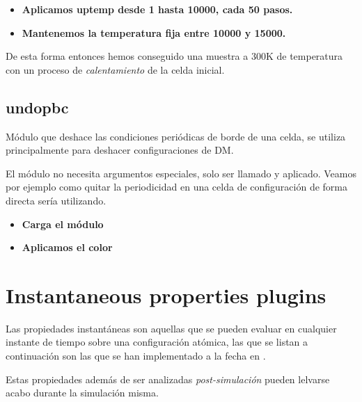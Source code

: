 \begin{itemize}
 \item \textbf{Aplicamos \textbf{uptemp} desde 1 hasta 10000, cada 50 pasos.}
 \item \textbf{Mantenemos la temperatura fija entre 10000 y 15000.}
\end{itemize}

De esta forma entonces hemos conseguido una muestra a 300K de temperatura con un
proceso de \textit{calentamiento} de la celda inicial.

\subsection{undopbc}
M\'odulo que deshace las condiciones peri\'odicas de borde de una celda, se
utiliza principalmente para deshacer configuraciones de DM.

El m\'odulo no necesita argumentos especiales, solo ser llamado y aplicado.
Veamos por ejemplo como quitar la periodicidad en una celda de configuraci\'on
de forma directa ser\'ia utilizando.

\begin{itemize}
 \item \textbf{Carga el m\'odulo}
 \item \textbf{Aplicamos el color}
\end{itemize}


\section{Instantaneous properties plugins}
Las propiedades instant\'aneas son aquellas que se pueden evaluar en cualquier
instante de tiempo sobre una configuraci\'on at\'omica, las que se listan a
continuaci\'on son las que se han implementado a la fecha en {\lpmd}.

Estas propiedades adem\'as de ser analizadas \textit{post-simulaci\'on} pueden
lelvarse acabo durante la simulaci\'on misma.

